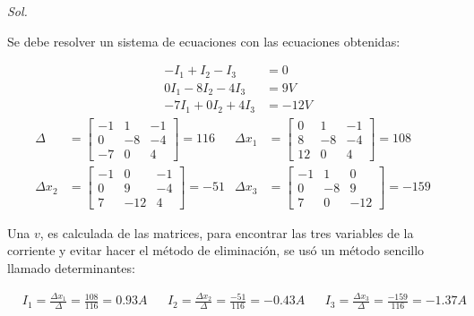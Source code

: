 \textit{ Sol. }

Se debe resolver un sistema de ecuaciones con las ecuaciones obtenidas:

\begin{align*}
	 & -I_{1}+I_{2}-I_{3}    & =0    \\
	 & 0I_{1}-8I_{2}-4I_{3}  & =9V   \\
	 & -7I_{1}+0I_{2}+4I_{3} & =-12V
\end{align*}
\begin{align*}
	\Delta       & = \begin{bmatrix}
		                 -1 & 1  & -1 \\
		                 0  & -8 & -4 \\
		                 -7 & 0  & 4
	                 \end{bmatrix}=116 & \Delta x_1& = \begin{bmatrix}
		                                                      0  & 1  & -1 \\
		                                                      8  & -8 & -4 \\
		                                                      12 & 0  & 4
	                                                      \end{bmatrix}=108  \\
	\Delta x_{2} & = \begin{bmatrix}
		                 -1 & 0   & -1 \\
		                 0  & 9   & -4 \\
		                 7  & -12 & 4
	                 \end{bmatrix}=-51 & \Delta x_{3} & = \begin{bmatrix}
		                                                      -1 & 1  & 0   \\
		                                                      0  & -8 & 9   \\
		                                                      7  & 0  & -12
	                                                      \end{bmatrix}=-159
\end{align*}

Una $v$, es calculada de las matrices, para encontrar las tres variables de la corriente y evitar hacer el método de eliminación,
se usó un método sencillo llamado determinantes:

\begin{align*}
	 & I_{1}=\frac{\Delta x_{1}}{\Delta}=\frac{108}{116}=0.93A   &
	 & I_{2}=\frac{\Delta x_{2}}{\Delta}=\frac{-51}{116}=-0.43A  &
	 & I_{3}=\frac{\Delta x_{3}}{\Delta}=\frac{-159}{116}=-1.37A
\end{align*}

